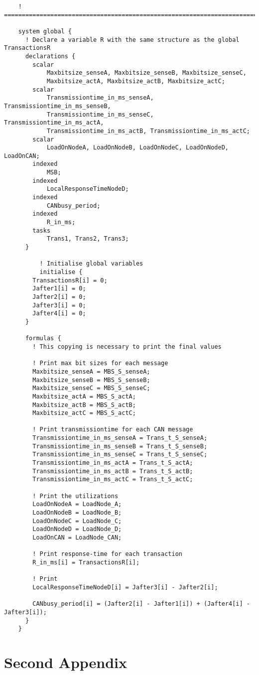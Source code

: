 \begin{lstlisting}
	! =======================================================================
	
	system global {
	  ! Declare a variable R with the same structure as the global TransactionsR
	  declarations {
		scalar
			Maxbitsize_senseA, Maxbitsize_senseB, Maxbitsize_senseC, 
			Maxbitsize_actA, Maxbitsize_actB, Maxbitsize_actC; 
		scalar	
			Transmissiontime_in_ms_senseA, Transmissiontime_in_ms_senseB, 
			Transmissiontime_in_ms_senseC, Transmissiontime_in_ms_actA, 
			Transmissiontime_in_ms_actB, Transmissiontime_in_ms_actC;
		scalar
			LoadOnNodeA, LoadOnNodeB, LoadOnNodeC, LoadOnNodeD, LoadOnCAN;  
		indexed
			MSB;
		indexed
			LocalResponseTimeNodeD;
		indexed	
			CANbusy_period;
		indexed 
			R_in_ms;
		tasks
			Trans1, Trans2, Trans3;
	  }
	  
		  ! Initialise global variables
		  initialise {
		TransactionsR[i] = 0;
		Jafter1[i] = 0;
		Jafter2[i] = 0;
		Jafter3[i] = 0;
		Jafter4[i] = 0;
	  }
	
	  formulas {
		! This copying is necessary to print the final values
		
		! Print max bit sizes for each message
		Maxbitsize_senseA = MBS_S_senseA;
		Maxbitsize_senseB = MBS_S_senseB;
		Maxbitsize_senseC = MBS_S_senseC;
		Maxbitsize_actA = MBS_S_actA;
		Maxbitsize_actB = MBS_S_actB;
		Maxbitsize_actC = MBS_S_actC;
		
		! Print transmissiontime for each CAN message
		Transmissiontime_in_ms_senseA = Trans_t_S_senseA;
		Transmissiontime_in_ms_senseB = Trans_t_S_senseB;
		Transmissiontime_in_ms_senseC = Trans_t_S_senseC;
		Transmissiontime_in_ms_actA = Trans_t_S_actA;
		Transmissiontime_in_ms_actB = Trans_t_S_actB;
		Transmissiontime_in_ms_actC = Trans_t_S_actC;
	
		! Print the utilizations
		LoadOnNodeA = LoadNode_A;
		LoadOnNodeB = LoadNode_B;
		LoadOnNodeC = LoadNode_C;
		LoadOnNodeD = LoadNode_D;
		LoadOnCAN = LoadNode_CAN;
	
		! Print response-time for each transaction
		R_in_ms[i] = TransactionsR[i];
	
		! Print 
		LocalResponseTimeNodeD[i] = Jafter3[i] - Jafter2[i];
	
		CANbusy_period[i] = (Jafter2[i] - Jafter1[i]) + (Jafter4[i] - Jafter3[i]);
	  }
	}

\end{lstlisting}

\section{Second Appendix}

